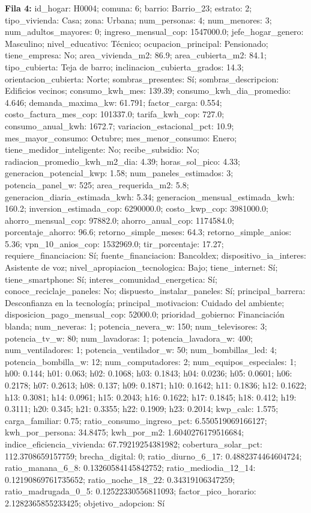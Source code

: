 {\footnotesize\textbf{Fila 4:} id\_hogar: H0004; comuna: 6; barrio: Barrio\_23; estrato: 2; tipo\_vivienda: Casa; zona: Urbana; num\_personas: 4; num\_menores: 3; num\_adultos\_mayores: 0; ingreso\_mensual\_cop: 1547000.0; jefe\_hogar\_genero: Masculino; nivel\_educativo: Técnico; ocupacion\_principal: Pensionado; tiene\_empresa: No; area\_vivienda\_m2: 86.9; area\_cubierta\_m2: 84.1; tipo\_cubierta: Teja de barro; inclinacion\_cubierta\_grados: 14.3; orientacion\_cubierta: Norte; sombras\_presentes: Sí; sombras\_descripcion: Edificios vecinos; consumo\_kwh\_mes: 139.39; consumo\_kwh\_dia\_promedio: 4.646; demanda\_maxima\_kw: 61.791; factor\_carga: 0.554; costo\_factura\_mes\_cop: 101337.0; tarifa\_kwh\_cop: 727.0; consumo\_anual\_kwh: 1672.7; variacion\_estacional\_pct: 10.9; mes\_mayor\_consumo: Octubre; mes\_menor\_consumo: Enero; tiene\_medidor\_inteligente: No; recibe\_subsidio: No; radiacion\_promedio\_kwh\_m2\_dia: 4.39; horas\_sol\_pico: 4.33; generacion\_potencial\_kwp: 1.58; num\_paneles\_estimados: 3; potencia\_panel\_w: 525; area\_requerida\_m2: 5.8; generacion\_diaria\_estimada\_kwh: 5.34; generacion\_mensual\_estimada\_kwh: 160.2; inversion\_estimada\_cop: 6290000.0; costo\_kwp\_cop: 3981000.0; ahorro\_mensual\_cop: 97882.0; ahorro\_anual\_cop: 1174584.0; porcentaje\_ahorro: 96.6; retorno\_simple\_meses: 64.3; retorno\_simple\_anios: 5.36; vpn\_10\_anios\_cop: 1532969.0; tir\_porcentaje: 17.27; requiere\_financiacion: Sí; fuente\_financiacion: Bancoldex; dispositivo\_ia\_interes: Asistente de voz; nivel\_apropiacion\_tecnologica: Bajo; tiene\_internet: Sí; tiene\_smartphone: Sí; interes\_comunidad\_energetica: Sí; conoce\_reciclaje\_paneles: No; dispuesto\_instalar\_paneles: Sí; principal\_barrera: Desconfianza en la tecnología; principal\_motivacion: Cuidado del ambiente; disposicion\_pago\_mensual\_cop: 52000.0; prioridad\_gobierno: Financiación blanda; num\_neveras: 1; potencia\_nevera\_w: 150; num\_televisores: 3; potencia\_tv\_w: 80; num\_lavadoras: 1; potencia\_lavadora\_w: 400; num\_ventiladores: 1; potencia\_ventilador\_w: 50; num\_bombillas\_led: 4; potencia\_bombilla\_w: 12; num\_computadores: 2; num\_equipos\_especiales: 1; h00: 0.144; h01: 0.063; h02: 0.1068; h03: 0.1843; h04: 0.0236; h05: 0.0601; h06: 0.2178; h07: 0.2613; h08: 0.137; h09: 0.1871; h10: 0.1642; h11: 0.1836; h12: 0.1622; h13: 0.3081; h14: 0.0961; h15: 0.2043; h16: 0.1622; h17: 0.1845; h18: 0.412; h19: 0.3111; h20: 0.345; h21: 0.3355; h22: 0.1909; h23: 0.2014; kwp\_calc: 1.575; carga\_familiar: 0.75; ratio\_consumo\_ingreso\_pct: 6.550519069166127; kwh\_por\_persona: 34.8475; kwh\_por\_m2: 1.6040276179516684; indice\_eficiencia\_vivienda: 67.79219254381982; cobertura\_solar\_pct: 112.3708659157759; brecha\_digital: 0; ratio\_diurno\_6\_17: 0.4882374464604724; ratio\_manana\_6\_8: 0.13260584145842752; ratio\_mediodia\_12\_14: 0.12190869761735652; ratio\_noche\_18\_22: 0.34319106347259; ratio\_madrugada\_0\_5: 0.12522330556811093; factor\_pico\_horario: 2.1282365855233425; objetivo\_adopcion: Sí\par}
